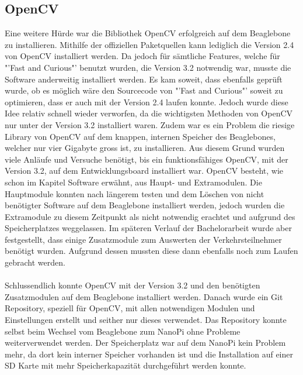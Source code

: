 \subsection{OpenCV}
Eine weitere Hürde war die Bibliothek OpenCV erfolgreich auf dem Beaglebone zu installieren. Mithilfe der offiziellen Paketquellen kann lediglich die Version 2.4 von OpenCV installiert werden. Da jedoch für sämtliche Features, welche für "'Fast and Curious"' benutzt wurden, die Version 3.2 notwendig war, musste die Software anderweitig installiert werden. Es kam soweit, dass ebenfalls geprüft wurde, ob es möglich wäre den Sourcecode von "'Fast and Curious"' soweit zu optimieren, dass er auch mit der Version 2.4 laufen konnte. Jedoch wurde diese Idee relativ schnell wieder verworfen, da die wichtigsten Methoden von OpenCV nur unter der Version 3.2 installiert waren. Zudem war es ein Problem die riesige Library von OpenCV auf dem knappen, internen Speicher des Beaglebones, welcher nur vier Gigabyte gross ist, zu installieren. Aus diesem Grund wurden viele Anläufe und Versuche benötigt, bis ein funktionsfähiges OpenCV, mit der Version 3.2, auf dem Entwicklungsboard installiert war. OpenCV besteht, wie schon im Kapitel Software erwähnt, aus Haupt- und Extramodulen. Die Hauptmodule konnten nach längerem testen und dem Löschen von nicht benötigter Software auf dem Beaglebone installiert werden, jedoch wurden die Extramodule zu diesem Zeitpunkt als nicht notwendig erachtet und aufgrund des Speicherplatzes weggelassen. Im späteren Verlauf der Bachelorarbeit wurde aber festgestellt, dass einige Zusatzmodule zum Auswerten der Verkehrsteilnehmer benötigt wurden. Aufgrund dessen mussten diese dann ebenfalls noch zum Laufen gebracht werden.\\\\
Schlussendlich konnte OpenCV mit der Version 3.2 und den benötigten Zusatzmodulen auf dem Beaglebone installiert werden. Danach wurde ein Git Repository, speziell für OpenCV, mit allen notwendigen Modulen und Einstellungen erstellt und seither nur dieses verwendet. Das Repository konnte selbst beim Wechsel vom Beaglebone zum NanoPi ohne Probleme weiterverwendet werden. Der Speicherplatz war auf dem NanoPi kein Problem mehr, da dort kein interner Speicher vorhanden ist und die Installation auf einer SD Karte mit mehr Speicherkapazität durchgeführt werden konnte.